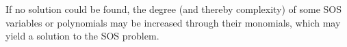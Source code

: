 %
%
%
%

If no solution could be found, the degree (and thereby complexity) of some SOS variables or polynomials may be increased through their monomials, which may yield a solution to the SOS problem.


